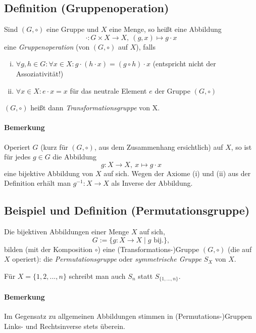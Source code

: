 \subsection{Definition (Gruppenoperation)}
	\begin{Definition}[Gruppenoperation]
		Sind $(G,\circ )$ eine Gruppe und $X$ eine Menge, so heißt eine Abbildung
		\[ \cdot : G\times X\to X,\ (g,x)\mapsto g\cdot x \]
	eine \emph{Gruppenoperation} (von $(G,\circ )$ auf $X$), falls
	\begin{enumerate}[(i)]
		\item $\forall g,h\in G :\forall x\in X: g\cdot (h\cdot x) = (g\circ h)\cdot x$ (entspricht nicht der Assoziativität!)
		\item $\forall x\in X: e\cdot x = x$ für das neutrale Element $e$ der Gruppe $(G,\circ )$
	\end{enumerate}
	$(G,\circ )$ heißt dann \emph{Transformationsgruppe} von X.
	\end{Definition}

\paragraph{Bemerkung}
	Operiert $G$ (kurz für $(G,\circ )$, aus dem Zusammenhang ersichtlich) auf $X$, so ist für jedes $g\in G$ die Abbildung
		\[ g:X\to X,\ x\mapsto g\cdot x \]
	eine bijektive Abbildung von $X$ auf sich. Wegen der Axiome (i) und (ii) aus der Definition erhält man $g^{-1}: X\to X$ als Inverse der Abbildung.
	
\subsection{Beispiel und Definition (Permutationsgruppe)}
	\begin{Definition}[Permutationsgruppe]
		Die bijektiven Abbildungen einer Menge $X$ auf sich, 
		\[ G:= \{g:X\to X\mid g \text{ bij.}\}, \]
	bilden (mit der Komposition $\circ$) eine (Transformations-)Gruppe $(G,\circ )$ (die auf $X$ operiert): die \emph{Permutationsgruppe} oder \emph{symmetrische Gruppe} $S_X$ von $X$.
	
	Für $X=\{1,2,...,n\}$ schreibt man auch $S_n$ statt $S_{\{1,...,n\}}$.
	\end{Definition}
\paragraph{Bemerkung}
	Im Gegensatz zu allgemeinen Abbildungen stimmen in (Permutations-)Gruppen Links- und Rechtsinverse stets überein.

